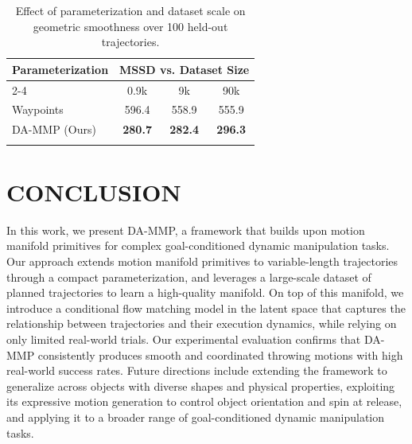 \documentclass[letterpaper, 10 pt, conference]{ieeeconf}  %
\begin{document}
\begin{table}[t]
\centering
\caption{
Effect of parameterization and dataset scale on geometric smoothness over 100 held-out trajectories.
}
\renewcommand{\arraystretch}{1.1}
\setlength{\tabcolsep}{8pt}
\begin{tabular}{lccc}
\Xhline{1.2pt}
\textbf{Parameterization} & \multicolumn{3}{c}{\textbf{MSSD vs. Dataset Size}} \\
\cline{2-4}
& 0.9k & 9k & 90k \\
\hline
Waypoints & 596.4 & 558.9 & 555.9 \\
DA-MMP (Ours) & \textbf{280.7} & \textbf{282.4} & \textbf{296.3} \\
\Xhline{1.2pt}
\end{tabular}
\label{tab:ablation_rbf}
\vspace{-10pt}
\end{table}

\section{CONCLUSION}

In this work, we present DA-MMP, a framework that builds upon motion manifold primitives for complex goal-conditioned dynamic manipulation tasks.
Our approach extends motion manifold primitives to variable-length trajectories through a compact parameterization, and leverages a large-scale dataset of planned trajectories to learn a high-quality manifold. 
On top of this manifold, we introduce a conditional flow matching model in the latent space that captures the relationship between trajectories and their execution dynamics, while relying on only limited real-world trials.
Our experimental evaluation confirms that DA-MMP consistently produces smooth and coordinated throwing motions with high real-world success rates.
Future directions include extending the framework to generalize across objects with diverse shapes and physical properties, exploiting its expressive motion generation to control object orientation and spin at release, and applying it to a broader range of goal-conditioned dynamic manipulation tasks.

\end{document}
